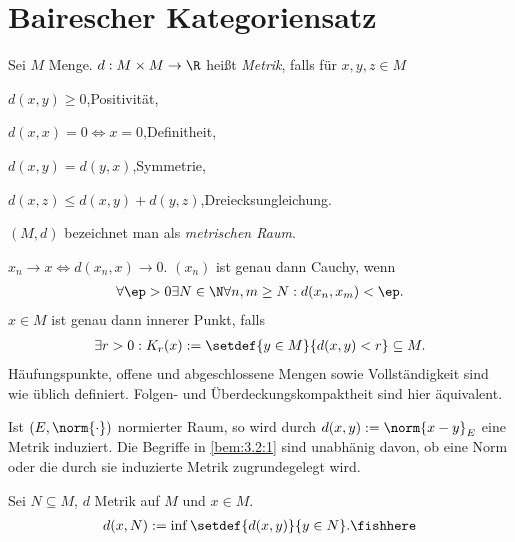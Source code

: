 \chapter{Bairescher Kategoriensatz}

\begin{defn}
\label{defn:3.1}
Sei $M$ Menge. $d: M\times M\to \R$ heißt
\emph{Metrik}, falls für $x,y,z\in M$
\begin{defnenum}
  \item $d(x,y) \ge 0$,\qquad Positivität,
  \item $d(x,x) = 0\Leftrightarrow x = 0$,\qquad Definitheit,
  \item $d(x,y)=d(y,x)$,\qquad Symmetrie,
  \item $d(x,z)\le d(x,y)+d(y,z)$,\qquad Dreiecksungleichung.
\end{defnenum}  
$(M,d)$ bezeichnet man als \emph{metrischen
Raum}.\fishhere
\end{defn}

\begin{bem}
\label{bem:3.2}
\begin{bemenum}
  \item\label{bem:3.2:1} $x_n\to x \Leftrightarrow d(x_n,x)\to 0$. $(x_n)$ ist
  genau dann Cauchy, wenn
\begin{align*}
\forall \ep > 0 \exists N\in\N \forall n,m\ge N : d(x_n,x_m) < \ep.
\end{align*}
$x\in M$ ist genau dann innerer Punkt, falls
\begin{align*}
\exists r > 0 : K_r(x):=\setdef{y\in M}{d(x,y)<r}\subseteq M.
\end{align*}
Häufungspunkte, offene und abgeschlossene Mengen sowie Vollständigkeit sind wie
üblich definiert. Folgen- und Überdeckungskompaktheit sind hier äquivalent.
\item Ist $(E,\norm{\cdot})$ normierter Raum, so wird durch
$d(x,y):=\norm{x-y}_E$ eine Metrik induziert. Die Begriffe in
\ref{bem:3.2:1} sind unabhänig davon, ob eine Norm oder die durch sie
induzierte Metrik zugrundegelegt wird.\maphere
\end{bemenum}
\end{bem}

\begin{defn}
\label{defn:3.3}
Sei $N\subseteq M$, $d$ Metrik auf $M$ und $x\in M$.
\begin{align*}
d(x,N) := \inf\setdef{d(x,y)}{y\in N}.\fishhere
\end{align*}
\end{defn}

